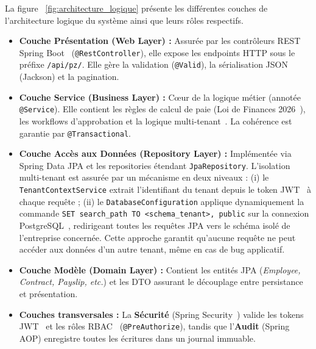 La figure ~\ref{fig:architecture_logique} présente les différentes couches de l'architecture 
logique du système ainsi que leurs rôles respectifs.

\begin{itemize}[label=\textbullet, leftmargin=*, itemsep=6pt, topsep=6pt, parsep=0pt]

    \item \textbf{Couche Présentation (Web Layer) :} Assurée par les contrôleurs REST Spring 
    Boot~\cite{springboot} (\texttt{@RestController}), elle expose les endpoints HTTP sous le 
    préfixe \texttt{/api/pz/}. Elle gère la validation (\texttt{@Valid}), la sérialisation 
    JSON (Jackson) et la pagination.

    \item \textbf{Couche Service (Business Layer) :} Cœur de la logique métier (annotée 
    \texttt{@Service}). Elle contient les règles de calcul de paie (Loi de Finances 
    2026~\cite{loifinance}), les workflows d'approbation et la logique 
    multi-tenant~\cite{multitenant}. La cohérence est garantie par \texttt{@Transactional}.

    \item \textbf{Couche Accès aux Données (Repository Layer) :} Implémentée via Spring Data 
    JPA et les repositories étendant \texttt{JpaRepository}. L'isolation multi-tenant est 
    assurée par un mécanisme en deux niveaux : (i) le \texttt{TenantContextService} extrait 
    l'identifiant du tenant depuis le token JWT~\cite{jwt} à chaque requête ; (ii) le 
    \texttt{DatabaseConfiguration} applique dynamiquement la commande 
    \texttt{SET search\_path TO <schema\_tenant>, public} sur la connexion 
    PostgreSQL~\cite{postgresql}, redirigeant toutes les requêtes JPA vers le schéma isolé 
    de l'entreprise concernée. Cette approche garantit qu'aucune requête ne peut accéder aux 
    données d'un autre tenant, même en cas de bug applicatif.

    \item \textbf{Couche Modèle (Domain Layer) :} Contient les entités JPA 
    (\textit{Employee, Contract, Payslip, etc.}) et les DTO assurant le découplage entre 
    persistance et présentation.

    \item \textbf{Couches transversales :} La \textbf{Sécurité} (Spring 
    Security~\cite{springboot}) valide les tokens JWT~\cite{jwt} et les rôles 
    RBAC~\cite{rbac} (\texttt{@PreAuthorize}), tandis que l'\textbf{Audit} (Spring AOP) 
    enregistre toutes les écritures dans un journal immuable.
\end{itemize}

